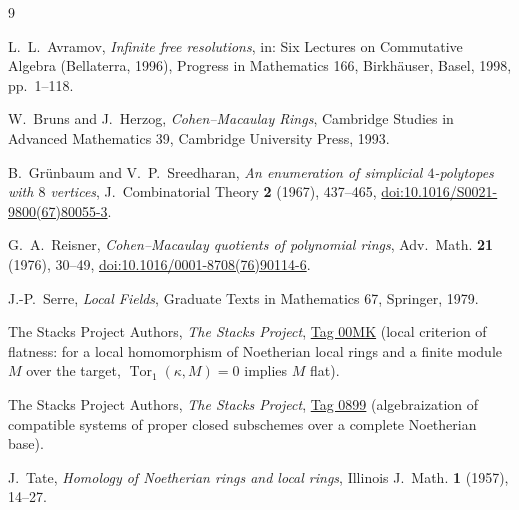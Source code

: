 \documentclass[11pt]{article}
\theoremstyle{definition}
\theoremstyle{remark}
\newcommand{\Tor}{\operatorname{Tor}}
\begin{document}
\begin{thebibliography}{9}

L.~L.~Avramov,
\emph{Infinite free resolutions}, in: Six Lectures on Commutative Algebra
(Bellaterra, 1996), Progress in Mathematics 166, Birkh\"auser, Basel,
1998, pp.~1--118.

W.~Bruns and J.~Herzog,
\emph{Cohen--Macaulay Rings}, Cambridge Studies in Advanced Mathematics 39,
Cambridge University Press, 1993.

B.~Gr\"unbaum and V.~P.~Sreedharan,
\emph{An enumeration of simplicial $4$-polytopes with $8$ vertices},
J.~Combinatorial Theory \textbf{2} (1967), 437--465,
\href{https://doi.org/10.1016/S0021-9800(67)80055-3}
{doi:10.1016/S0021-9800(67)80055-3}.

G.~A.~Reisner,
\emph{Cohen--Macaulay quotients of polynomial rings},
Adv.~Math. \textbf{21} (1976), 30--49,
\href{https://doi.org/10.1016/0001-8708(76)90114-6}
{doi:10.1016/0001-8708(76)90114-6}.

J.-P.~Serre,
\emph{Local Fields}, Graduate Texts in Mathematics 67, Springer, 1979.

The Stacks Project Authors, \emph{The Stacks Project},
\href{https://stacks.math.columbia.edu/tag/00MK}{Tag 00MK}
(local criterion of flatness: for a local homomorphism of Noetherian local
rings and a finite module $M$ over the target,
$\Tor_1(\kappa,M)=0$ implies $M$ flat).

The Stacks Project Authors, \emph{The Stacks Project},
\href{https://stacks.math.columbia.edu/tag/0899}{Tag 0899}
(algebraization of compatible systems of proper closed subschemes over a
complete Noetherian base).

J.~Tate,
\emph{Homology of Noetherian rings and local rings},
Illinois J.~Math. \textbf{1} (1957), 14--27.

\end{thebibliography}
\end{document}
